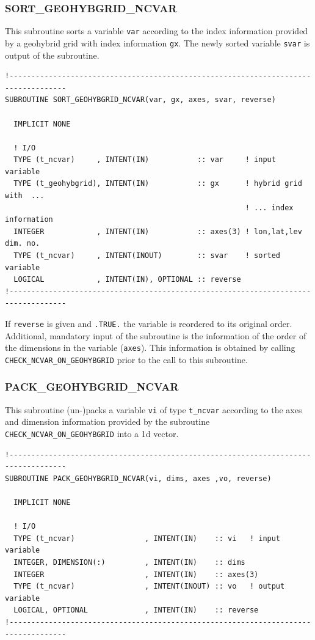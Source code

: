 \documentclass[11pt,twoside]{article}
\begin{document}
\subsubsection{SORT\_GEOHYBGRID\_NCVAR\label{SORTGRIDVAR}}
This subroutine sorts a variable \verb|var| according to the index information
 provided by a geohybrid grid with index information \verb|gx|. 
The newly sorted variable \verb|svar| is output of the subroutine.
\begin{verbatim}
!-----------------------------------------------------------------------------------
SUBROUTINE SORT_GEOHYBGRID_NCVAR(var, gx, axes, svar, reverse)

  IMPLICIT NONE

  ! I/O
  TYPE (t_ncvar)     , INTENT(IN)           :: var     ! input variable
  TYPE (t_geohybgrid), INTENT(IN)           :: gx      ! hybrid grid with  ...
                                                       ! ... index information
  INTEGER            , INTENT(IN)           :: axes(3) ! lon,lat,lev dim. no.
  TYPE (t_ncvar)     , INTENT(INOUT)        :: svar    ! sorted variable
  LOGICAL            , INTENT(IN), OPTIONAL :: reverse
!-----------------------------------------------------------------------------------
\end{verbatim}
If \verb|reverse| is given and \verb|.TRUE.| the variable is reordered to
its original order. 
Additional, mandatory input of the subroutine is the information of the order
of the dimensions in the variable (\verb|axes|). 
This information is obtained by calling \verb|CHECK_NCVAR_ON_GEOHYBGRID|
prior to the call to this subroutine.

\subsubsection{PACK\_GEOHYBGRID\_NCVAR\label{PACKGRIDVAR}}
This subroutine (un-)packs a variable \verb|vi| of type \verb|t_ncvar|
 according to the axes and dimension information provided by the subroutine
\verb|CHECK_NCVAR_ON_GEOHYBGRID| into a 1d vector.

\begin{verbatim}
!-----------------------------------------------------------------------------------
SUBROUTINE PACK_GEOHYBGRID_NCVAR(vi, dims, axes ,vo, reverse)

  IMPLICIT NONE

  ! I/O
  TYPE (t_ncvar)                , INTENT(IN)    :: vi   ! input variable
  INTEGER, DIMENSION(:)         , INTENT(IN)    :: dims
  INTEGER                       , INTENT(IN)    :: axes(3)
  TYPE (t_ncvar)                , INTENT(INOUT) :: vo   ! output variable
  LOGICAL, OPTIONAL             , INTENT(IN)    :: reverse
!-----------------------------------------------------------------------------------
\end{verbatim}
\end{document}
